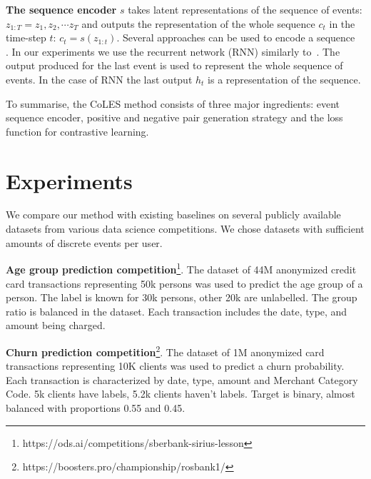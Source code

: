 \documentclass{article}
\begin{document}
\textbf{The sequence encoder} $s$ takes latent representations of the sequence of events: $ z_{1:T} = z_1, z_2, \cdots z_T $ and outputs the representation of the whole sequence $c_t$ in the time-step $t$: $ c_t = s(z_{1:t}) $.
Several approaches can be used to encode a sequence~\citep{Cho2014LearningPR, Vaswani2017AttentionIA} . In our experiments we use the recurrent network (RNN) similarly to~\citep{Sutskever2014SequenceTS}. The output produced for the last event is used to represent the whole sequence of events. In the case of RNN the last output $h_t$ is a representation of the sequence.

To summarise, the CoLES method consists of three major ingredients: event sequence encoder, positive and negative pair generation strategy and the loss function for contrastive learning.


\section{Experiments} \label{sec-exp}

We compare our method with existing baselines on several publicly available datasets from various data science competitions. We chose datasets with sufficient amounts of discrete events per user.

\textbf{Age group prediction competition}\footnote{https://ods.ai/competitions/sberbank-sirius-lesson}. The dataset of 44M anonymized credit card transactions representing 50k persons was used to predict the age group of a person. The label is known for 30k persons, other 20k are unlabelled. The group ratio is balanced in the dataset. Each transaction includes the date, type, and amount being charged.


\textbf{Churn prediction competition}\footnote{https://boosters.pro/championship/rosbank1/}. The dataset of 1M anonymized card transactions representing 10K clients was used to predict a churn probability. Each transaction is characterized by date, type, amount and Merchant Category Code. 5k clients have labels, 5.2k clients haven't labels. Target is binary, almost balanced with proportions 0.55 and 0.45.
\end{document}
